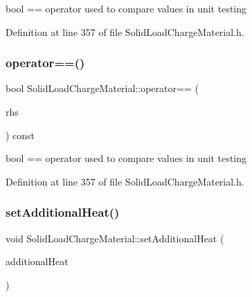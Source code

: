 bool == operator used to compare values in unit testing 

Definition at line 357 of file Solid\+Load\+Charge\+Material.\+h.

\mbox{\label{class_solid_load_charge_material_aacf2f41ce38067a52fb7d8456a05a699}} 
\subsubsection{\texorpdfstring{operator==()}{operator==()}\hspace{0.1cm}{\footnotesize\ttfamily [3/3]}}
{\footnotesize\ttfamily bool Solid\+Load\+Charge\+Material\+::operator== (\begin{DoxyParamCaption}\item[{const \hyperlink{class_solid_load_charge_material}{Solid\+Load\+Charge\+Material} \&}]{rhs }\end{DoxyParamCaption}) const\hspace{0.3cm}{\ttfamily [inline]}}

bool == operator used to compare values in unit testing 

Definition at line 357 of file Solid\+Load\+Charge\+Material.\+h.

\mbox{\label{class_solid_load_charge_material_a849fd29a3ecb95be2e9d34f9280b1b94}} 
\subsubsection{\texorpdfstring{set\+Additional\+Heat()}{setAdditionalHeat()}\hspace{0.1cm}{\footnotesize\ttfamily [1/3]}}
{\footnotesize\ttfamily void Solid\+Load\+Charge\+Material\+::set\+Additional\+Heat (\begin{DoxyParamCaption}\item[{const double}]{additional\+Heat }\end{DoxyParamCaption})\hspace{0.3cm}{\ttfamily [inline]}}

